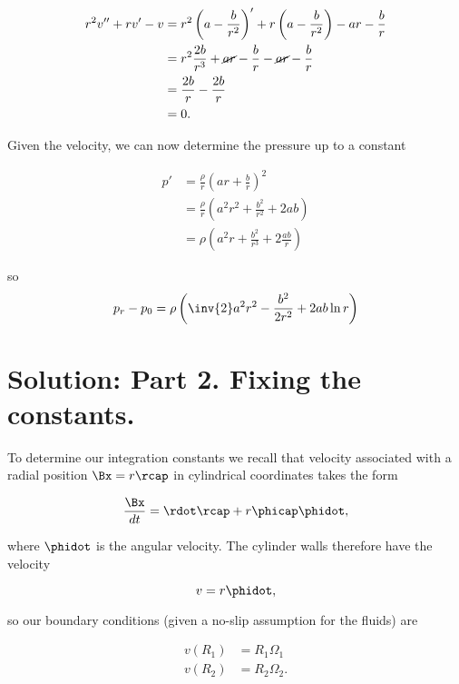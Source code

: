 \begin{align*}
r^2 v'' + r v' - v 
&=
r^2 \left( a -\frac{b}{r^2} \right)' + r \left( a -\frac{b}{r^2} \right) - a r - \frac{b}{r} \\
&=
r^2 \frac{2 b}{r^3} + \cancel{a r} - \frac{b}{r} - \cancel{a r} - \frac{b}{r} \\
&=
\frac{2 b}{r} - \frac{2 b}{r} \\
&= 0.
\end{align*}

Given the velocity, we can now determine the pressure up to a constant

\begin{align*}
p' 
&= \frac{\rho}{r} \left( a r + \frac{b}{r} \right)^2 \\
&= \frac{\rho}{r} \left( a^2 r^2 + \frac{b^2}{r^2} + 2 a b \right) \\
&= \rho \left( a^2 r + \frac{b^2}{r^3} + 2 \frac{a b}{r} \right)
\end{align*}

so
\begin{equation}\label{eqn:couetteFlow:190}
p_r -p_0
= \rho \left( \inv{2} a^2 r^2 - \frac{b^2}{2 r^2} + 2 a b \ln r \right)
\end{equation}

\section{Solution: Part 2.  Fixing the constants.}

To determine our integration constants we recall that velocity associated with a radial position $\Bx = r \rcap$ in cylindrical coordinates takes the form

\begin{equation}\label{eqn:couetteFlow:210}
\frac{\Bx}{dt} = \rdot \rcap + r \phicap \phidot,
\end{equation}

where $\phidot$ is the angular velocity.  The cylinder walls therefore have the velocity

\begin{equation}\label{eqn:couetteFlow:230}
v = r \phidot,
\end{equation}

so our boundary conditions (given a no-slip assumption for the fluids) are

\begin{align}\label{eqn:couetteFlow:250}
v(R_1) &= R_1 \Omega_1 \\
v(R_2) &= R_2 \Omega_2.
\end{align}


